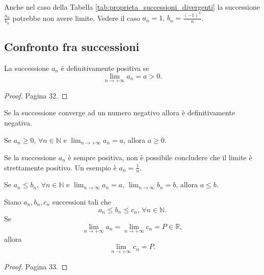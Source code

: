 \begin{remark}
    Anche nel caso della Tabella \ref{tab:proprieta_successioni_divergenti} la successione $\frac{a_n}{b_n}$ potrebbe non avere limite. Vedere il caso $a_n=1,\, b_n=\frac{(-1)^n}{n}$.
\end{remark}

\subsection{Confronto fra successioni}
\begin{theorem}
    La successione $a_n$ è definitivamente positiva se
    \begin{equation*}
        \lim_{n\rightarrow +\infty}a_n=a>0.
    \end{equation*}
\end{theorem}
\begin{proof}
    Pagina 32.
\end{proof}

Se la successione converge ad un numero negativo allora è definitivamente negativa.

\begin{corollary}
    Se $a_n\geq 0,\,\forall n\in\mathbb N$ e $\lim_{n\rightarrow +\infty}a_n=a$, allora $a\geq 0$.
\end{corollary}

\begin{remark}
    Se la successione $a_n$ è sempre positiva, non è possibile concludere che il limite è strettamente positivo. Un esempio è $a_n=\frac{1}{n}$.
\end{remark}

\begin{corollary}
    Se $a_n\leq b_n,\,\forall n\in\mathbb N$ e $\lim_{n\rightarrow\infty}a_n=a,\, \lim_{n\rightarrow\infty}b_n=b$, allora $a\leq b$.
\end{corollary}

\begin{theorem}
    Siano $a_n,b_n,c_n$ successioni tali che
    \begin{equation*}
        a_n\leq b_n\leq c_n,\,\forall n\in\mathbb N.
    \end{equation*}
    Se
    \begin{equation*}
        \lim_{n\rightarrow+\infty}a_n=\lim_{n\rightarrow+\infty}c_n=P\in\mathbb R,
    \end{equation*}
    allora
    \begin{equation*}
        \lim_{n\rightarrow+\infty}c_n=P.
    \end{equation*}
\end{theorem}
\begin{proof}
    Pagina 33.
\end{proof}


